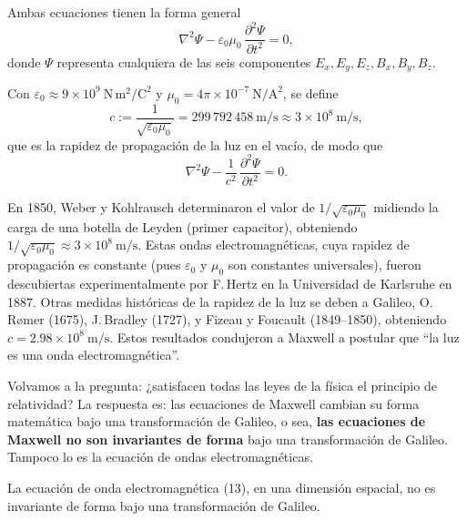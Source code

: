 Ambas ecuaciones tienen la forma general
\[
\nabla^2\Psi - \varepsilon_0\mu_0\, \frac{\partial^2\Psi}{\partial t^2}
= 0, \tag{11}
\]
donde $\Psi$ representa cualquiera de las seis componentes $E_x, E_y,
E_z, B_x, B_y, B_z$.

\begin{proposicionc}
Con $\varepsilon_0\approx 9\times10^9\ \text{N}\,\text{m}^2/\text{C}^2$
y $\mu_0=4\pi\times10^{-7}\ \text{N}/\text{A}^2$, se define
\[
c := \frac{1}{\sqrt{\varepsilon_0\mu_0}} = 299\,792\,458\ \text{m/s}
\approx 3\times10^8\ \text{m/s}, \tag{12}
\]
que es la rapidez de propagación de la luz en el vacío, de modo que
\[
\nabla^2\Psi - \frac{1}{c^2}\, \frac{\partial^2\Psi}{\partial t^2} = 0
. \tag{13}
\]
\end{proposicionc}

\begin{observacion}
En 1850, Weber y Kohlrausch determinaron el valor de
$1/\sqrt{\varepsilon_0\mu_0}$ midiendo la carga de una botella de Leyden
(primer capacitor), obteniendo $1/\sqrt{\varepsilon_0\mu_0}\approx
3\times10^8\ \text{m/s}$. Estas ondas electromagnéticas, cuya rapidez de
propagación es constante (pues $\varepsilon_0$ y $\mu_0$ son constantes
universales), fueron descubiertas experimentalmente por F.\,Hertz en la
Universidad de Karlsruhe en 1887. Otras medidas históricas de la rapidez
de la luz se deben a Galileo, O.\,Rømer (1675), J.\,Bradley (1727), y
Fizeau y Foucault (1849--1850), obteniendo $c=2.98\times10^8\ \text{m/s}$.
Estos resultados condujeron a Maxwell a postular que ``la luz es una
onda electromagnética''.
\end{observacion}

Volvamos a la pregunta: ¿satisfacen todas las leyes de la física el
principio de relatividad? La respuesta es: las ecuaciones de Maxwell
cambian su forma matemática bajo una transformación de Galileo, o sea,
\textbf{las ecuaciones de Maxwell no son invariantes de forma} bajo una
transformación de Galileo. Tampoco lo es la ecuación de ondas
electromagnéticas.

\begin{proposicionc}
La ecuación de onda electromagnética (13), en una dimensión espacial,
no es invariante de forma bajo una transformación de Galileo.
\end{proposicionc}

